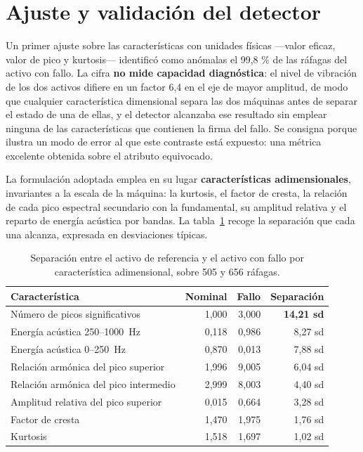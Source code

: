 \section{Ajuste y validación del detector}

Un primer ajuste sobre las características con unidades físicas —valor eficaz, valor de pico y
kurtosis— identificó como anómalas el 99,8 \% de las ráfagas del activo con fallo. La cifra
\textbf{no mide capacidad diagnóstica}: el nivel de vibración de los dos activos difiere en un
factor 6,4 en el eje de mayor amplitud, de modo que cualquier característica dimensional separa
las dos máquinas antes de separar el estado de una de ellas, y el detector alcanzaba ese
resultado sin emplear ninguna de las características que contienen la firma del fallo. Se
consigna porque ilustra un modo de error al que este contraste está expuesto: una métrica
excelente obtenida sobre el atributo equivocado.

La formulación adoptada emplea en su lugar \textbf{características adimensionales}, invariantes
a la escala de la máquina: la kurtosis, el factor de cresta, la relación de cada pico espectral
secundario con la fundamental, su amplitud relativa y el reparto de energía acústica por bandas.
La tabla~\ref{table:separacion-caracteristicas} recoge la separación que cada una alcanza,
expresada en desviaciones típicas.

\begin{table}[ht!]
\caption{Separación entre el activo de referencia y el activo con fallo por característica adimensional, sobre 505 y 656 ráfagas.}
\label{table:separacion-caracteristicas}
\centering
\begin{tabular}{|p{5.4cm}|r|r|r|}
\hline
\textbf{Característica} & \textbf{Nominal} & \textbf{Fallo} & \textbf{Separación} \\
\hline
Número de picos significativos & 1,000 & 3,000 & \textbf{14,21 sd} \\
\hline
Energía acústica \mbox{250--1000 Hz} & 0,118 & 0,986 & 8,27 sd \\
\hline
Energía acústica \mbox{0--250 Hz} & 0,870 & 0,013 & 7,88 sd \\
\hline
Relación armónica del pico superior & 1,996 & 9,005 & 6,04 sd \\
\hline
Relación armónica del pico intermedio & 2,999 & 8,003 & 4,40 sd \\
\hline
Amplitud relativa del pico superior & 0,015 & 0,664 & 3,28 sd \\
\hline
Factor de cresta & 1,470 & 1,975 & 1,76 sd \\
\hline
Kurtosis & 1,518 & 1,697 & 1,02 sd \\
\hline
\end{tabular}
\end{table}

